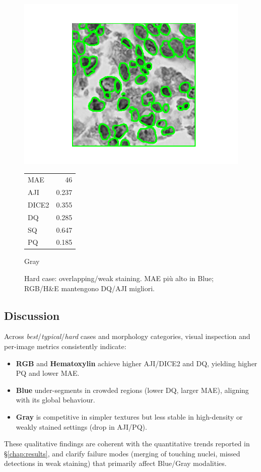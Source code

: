 \documentclass[target=bach,aauheader=,style=]{thud}
\begin{document}
\begin{figure}[ht]
\begin{minipage}{0.48\textwidth}
  \includegraphics[width=\linewidth]{imgs/qualitative/worst/Gray/contour_img.png}\\[-1ex]
  \footnotesize
  \begin{tabular}{@{}lr@{}}
   MAE & 46\\ AJI & 0.237\\ DICE2 & 0.355\\
   DQ & 0.285\\ SQ & 0.647\\ PQ & 0.185
  \end{tabular}
  \caption*{Gray}
\end{minipage}

\caption{Hard case: overlapping/weak staining. MAE più alto in Blue; RGB/H\&E mantengono DQ/AJI migliori.}
\label{fig:qual_hard}
\end{figure}

\subsection{Discussion}
Across \emph{best}/\emph{typical}/\emph{hard} cases and morphology categories, visual inspection and per-image metrics consistently indicate:
\begin{itemize}
  \item \textbf{RGB} and \textbf{Hematoxylin} achieve higher AJI/DICE2 and DQ, yielding higher PQ and lower MAE.
  \item \textbf{Blue} under-segments in crowded regions (lower DQ, larger MAE), aligning with its global behaviour.
  \item \textbf{Gray} is competitive in simpler textures but less stable in high-density or weakly stained settings (drop in AJI/PQ).
\end{itemize}
These qualitative findings are coherent with the quantitative trends reported in \S\ref{chap:results}, and clarify failure modes (merging of touching nuclei, missed detections in weak staining) that primarily affect Blue/Gray modalities.
\end{document}
